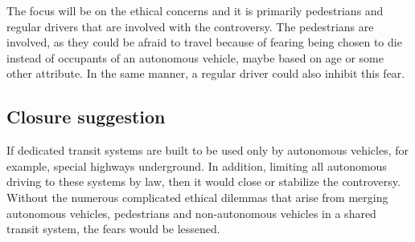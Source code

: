 The focus will be on the ethical concerns and it is primarily pedestrians and regular drivers that are involved with the controversy.
The pedestrians are involved, as they could be afraid to travel because of fearing being chosen to die instead of occupants of an autonomous vehicle, maybe based on age or some other attribute. 
In the same manner, a regular driver could also inhibit this fear.

\subsection*{Closure suggestion}
If dedicated transit systems are built to be used only by autonomous vehicles, for example, special highways underground.
In addition, limiting all autonomous driving to these systems by law, then it would close or stabilize the controversy.
Without the numerous complicated ethical dilemmas that arise from merging autonomous vehicles, pedestrians and non-autonomous vehicles in a shared transit system, the fears would be lessened.
